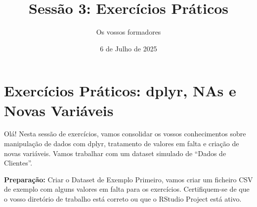 \documentclass[
]{article}
\title{Sessão 3: Exercícios Práticos}
\author{Os vossos formadores}
\date{6 de Julho de 2025}
\begin{document}
\maketitle

{
\setcounter{tocdepth}{3}
\tableofcontents
}
\section{Exercícios Práticos: dplyr, NAs e Novas
Variáveis}\label{exercuxedcios-pruxe1ticos-dplyr-nas-e-novas-variuxe1veis}

Olá! Nesta sessão de exercícios, vamos consolidar os vossos
conhecimentos sobre manipulação de dados com dplyr, tratamento de
valores em falta e criação de novas variáveis. Vamos trabalhar com um
dataset simulado de ``Dados de Clientes''.

\textbf{Preparação:} Criar o Dataset de Exemplo Primeiro, vamos criar um
ficheiro CSV de exemplo com alguns valores em falta para os exercícios.
Certifiquem-se de que o vosso diretório de trabalho está correto ou que
o RStudio Project está ativo.
\end{document}
